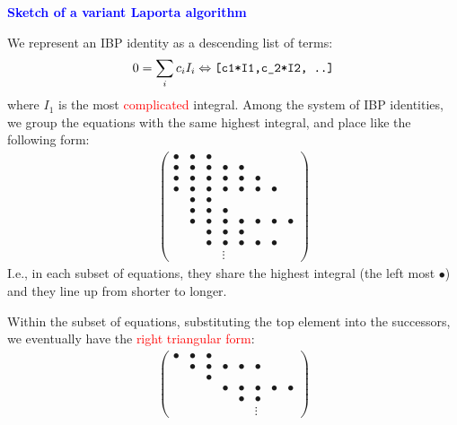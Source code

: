 \documentclass[10pt]{article}
\begin{document}
\textbf{\textcolor{blue}{Sketch of a variant Laporta algorithm}}

We represent an IBP identity as a descending list of terms:
\begin{eqnarray}
\nonumber
0 = \sum_i c_i I_i \Leftrightarrow \verb|[c1*I1,c_2*I2, ..]|
\end{eqnarray}
where $I_1$ is the most \textcolor{red}{complicated} integral.
Among the system of IBP identities, we group the equations with the same highest integral, and place like the following form:
\begin{eqnarray}
\nonumber
\left(\begin{array}{cccccccc} 
\bullet & \bullet & \bullet \\
\bullet & \bullet & \bullet & \bullet &\bullet \\
\bullet & \bullet & \bullet & \bullet &\bullet & \bullet\\
\bullet & \bullet & \bullet & \bullet &\bullet & \bullet & \bullet\\
&\bullet & \bullet & \\
&\bullet & \bullet & \bullet & \\
&\bullet & \bullet & \bullet &\bullet &\bullet &\bullet & \bullet\\
&&\bullet & \bullet & \bullet \\
&&\bullet & \bullet &\bullet & \bullet &\bullet \\
&&&\vdots
\end{array}\right)
\end{eqnarray}
I.e., in each subset of equations, they share the highest integral (the left most $\bullet$) and they line up from shorter to longer.

Within the subset of equations, substituting the top element into the successors, we eventually have the \textcolor{red}{right triangular form}:
\begin{eqnarray}
\nonumber
\left(\begin{array}{cccccccc} 
\bullet & \bullet & \bullet \\
&\bullet & \bullet & \bullet & \bullet &\bullet \\
&&\bullet \\
&&& \bullet & \bullet & \bullet &\bullet & \bullet\\
&&&&\bullet & \bullet & \\
&&&&&\vdots
\end{array}\right)
\end{eqnarray}
\end{document}
